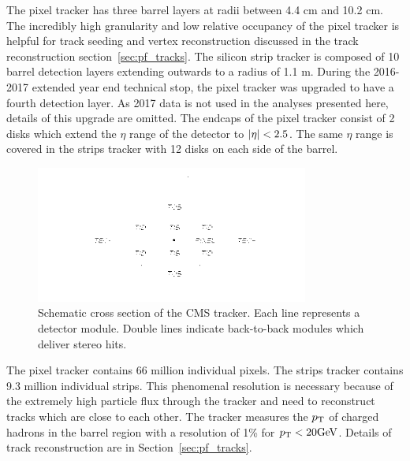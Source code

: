 The pixel tracker has three barrel layers at radii between 4.4 cm and 10.2 cm. The
incredibly high granularity and low relative occupancy of the pixel tracker 
is helpful for track seeding and vertex
reconstruction discussed in the track reconstruction section~\ref{sec:pf_tracks}.
The silicon strip tracker is composed of 10 barrel detection layers extending 
outwards to a radius of 1.1 m. During the 2016-2017 extended year end technical stop,
the pixel tracker was upgraded to have a fourth detection layer. As 2017 data is not used
in the analyses presented here, details of this upgrade are omitted.
The endcaps of the pixel tracker consist of 2 disks which extend the $\eta$ 
range of the detector to $\lvert\eta\rvert < 2.5$. The same $\eta$ range is covered in the
strips tracker with 12 disks on each side of the barrel.

\begin{figure}[htbp]
\centering
     \includegraphics[width=0.8\textwidth]{cms_and_lhc/plots/cms_tracker.png}
     \caption{
Schematic cross section of the CMS tracker. Each line represents a detector module. 
Double lines indicate back-to-back modules which deliver stereo hits.
     }
     \label{fig:cms_tracker}
\end{figure}

The pixel tracker contains 66 million individual pixels. The strips tracker
contains 9.3 million individual strips. This phenomenal resolution is necessary
because of the extremely high particle flux through the tracker and need to
reconstruct tracks which are close to each other.
The tracker measures the $p_\mathrm{T}$ of 
charged hadrons in the barrel region with a resolution of 1\% for $p_\mathrm{T} < 20\mathrm{GeV}$.
Details of track reconstruction are in Section~\ref{sec:pf_tracks}.

